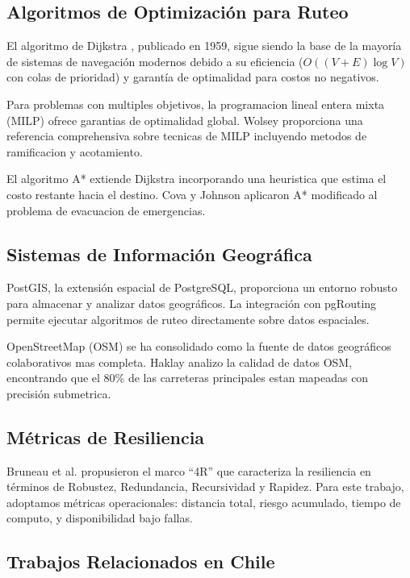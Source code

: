 \documentclass[conference]{IEEEtran}
\begin{document}
\subsection{Algoritmos de Optimización para Ruteo}

El algoritmo de Dijkstra \cite{dijkstra1959}, publicado en 1959, sigue siendo la base de la mayoría de sistemas de navegación modernos debido a su eficiencia ($O((V+E)\log V)$ con colas de prioridad) y garantía de optimalidad para costos no negativos.

Para problemas con multiples objetivos, la programacion lineal entera mixta (MILP) ofrece garantias de optimalidad global. Wolsey \cite{wolsey1998} proporciona una referencia comprehensiva sobre tecnicas de MILP incluyendo metodos de ramificacion y acotamiento.

El algoritmo A* \cite{hart1968} extiende Dijkstra incorporando una heuristica que estima el costo restante hacia el destino. Cova y Johnson \cite{cova2003} aplicaron A* modificado al problema de evacuacion de emergencias.

\subsection{Sistemas de Información Geográfica}

PostGIS, la extensión espacial de PostgreSQL, proporciona un entorno robusto para almacenar y analizar datos geográficos. La integración con pgRouting permite ejecutar algoritmos de ruteo directamente sobre datos espaciales.

OpenStreetMap (OSM) se ha consolidado como la fuente de datos geográficos colaborativos mas completa. Haklay \cite{haklay2010} analizo la calidad de datos OSM, encontrando que el 80\% de las carreteras principales estan mapeadas con precisión submetrica.

\subsection{Métricas de Resiliencia}

Bruneau et al. \cite{bruneau2003} propusieron el marco ``4R'' que caracteriza la resiliencia en términos de Robustez, Redundancia, Recursividad y Rapidez. Para este trabajo, adoptamos métricas operacionales: distancia total, riesgo acumulado, tiempo de computo, y disponibilidad bajo fallas.

\subsection{Trabajos Relacionados en Chile}
\end{document}
